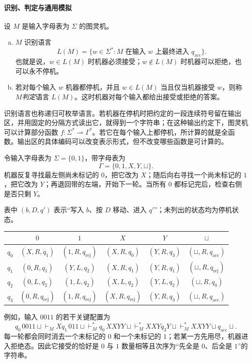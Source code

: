 \documentclass[lang=cn,a4paper,fontset=none,zihao=false,10pt,openany,twoside]{beautybook}
\numberwithin{algorithm}{chapter}
\begin{document}
\paragraph{识别、判定与通用模拟}
\begin{definition}[识别与判定]
设 $M$ 是输入字母表为 $\Sigma$ 的图灵机。
\begin{enumerate}[(a)]
\item $M$ 识别语言
\[
 L(M)=\{w\in\Sigma^*:M\text{ 在输入 }w\text{ 上最终进入 }q_{\mathrm{acc}}\}.
\]
也就是说，$w\in L(M)$ 时机器必须接受；$w\notin L(M)$ 时机器可以拒绝，也可以永不停机。
\item 若对每个输入 $w$ 机器都停机，并且 $w\in L(M)$ 当且仅当机器接受 $w$，则称 $M$\emph{判定}语言 $L(M)$。这时机器对每个输入都给出接受或拒绝的答案。
\end{enumerate}
\end{definition}

识别语言也称递归可枚举语言。若机器在停机时把约定的一段连续符号留在输出区，并用固定的分隔方式读出它，就得到一个字符串；在这种输出约定下，图灵机可以计算部分函数 $f:\Sigma^*\rightharpoonup\Gamma^*$。若它在每个输入上都停机，所计算的就是全函数。输出区的具体编码可以改变表示形式，但不改变哪些函数是可计算的。

\begin{example}
令输入字母表为 $\Sigma=\{0,1\}$，带字母表为
\[
 \Gamma=\{0,1,X,Y,\sqcup\}.
\]
机器反复寻找最左侧尚未标记的 $0$，把它改为 $X$；随后向右寻找一个尚未标记的 $1$，把它改为 $Y$；再退回带的左端，开始下一轮。当所有 $0$ 都标记完后，检查右侧是否只剩 $Y$。

表中 $(b,D,q')$ 表示“写入 $b$、按 $D$ 移动、进入 $q'$”；未列出的状态均为停机状态。
\begin{center}
{\small
\setlength{\tabcolsep}{2.5pt}
\renewcommand{\arraystretch}{1.15}
\begin{tabular}{c|ccccc}
\toprule
 & $0$ & $1$ & $X$ & $Y$ & $\sqcup$\\\midrule
$q_0$ & $(X,R,q_1)$ & $(1,R,q_{\mathrm{rej}})$ & $(X,R,q_0)$ & $(Y,R,q_3)$ & $(\sqcup,R,q_{\mathrm{acc}})$\\
$q_1$ & $(0,R,q_1)$ & $(Y,L,q_2)$ & $(X,R,q_1)$ & $(Y,R,q_1)$ & $(\sqcup,R,q_{\mathrm{rej}})$\\
$q_2$ & $(0,L,q_2)$ & $(1,L,q_2)$ & $(X,L,q_2)$ & $(Y,L,q_2)$ & $(\sqcup,R,q_0)$\\
$q_3$ & $(0,R,q_{\mathrm{rej}})$ & $(1,R,q_{\mathrm{rej}})$ & $(X,R,q_{\mathrm{rej}})$ & $(Y,R,q_3)$ & $(\sqcup,R,q_{\mathrm{acc}})$\\
\bottomrule
\end{tabular}}
\end{center}
例如，输入 $0011$ 的若干关键配置为
\[
 q_0\,0011\sqcup
 \vdash_M Xq_1\,011\sqcup
 \vdash_M^* q_0\,XXYY\sqcup
 \vdash_M^* XXYq_3Y\sqcup
 \vdash_M^* XXYY\sqcup q_{\mathrm{acc}}\sqcup.
\]
每一轮都会同时消去一个未标记的 $0$ 和一个未标记的 $1$；若某一方先用尽，机器进入拒绝态。因此它接受的恰好是 $0$ 与 $1$ 数量相等且次序为“先全是 $0$、后全是 $1$”的字符串。
\end{example}
\end{document}
